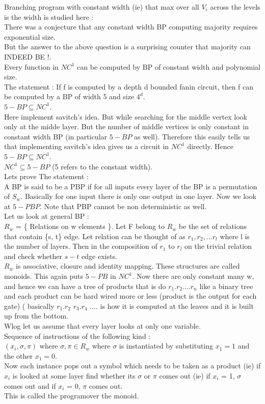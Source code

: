 \documentclass[solution,addpoints,12pt]{exam}
\begin{document}
Branching program with constant width (ie) that max over all $V_i$ across
the levels is the width is studied here :\\
There was a conjecture that any constant width BP computing majority requires exponential
size.\\
But the answer to the above question is a surprising counter that majority can INDEED BE !.\\
Every function in ${NC}^1$ can be computed by BP of constant width and polynomial size.\\
The statement : If f is computed by a depth d bounded fanin circuit, then f can be computed
by a BP of width 5 and size $4^d$.\\
$5-BP \subseteq {NC}^1$.\\
Here implement savitch's idea. But while searching for the middle vertex
look only at the midde layer. But the number of middle vertices is only
constant in constant width BP (in particular $5-BP$ as well). Therefore
this easily tells us that implementing savitch's idea gives us a circuit in
${NC}^1$ directly. Hence $5-BP \subseteq {NC}^1$.\\

${NC}^1 \subseteq 5-BP$ (5 refers to the constant width).\\

Lets prove The statement :\\
A BP is said to be a PBP if for all inputs every layer of the BP is
a permutation of $S_w$. Basically for one input there is only one output in one layer.
Now we look at $5-PBP$. Note that PBP cannot be non deterministic as well.\\
Let us look at general BP :\\
$R_w$ = \{ Relations on w elements \}. Let F belong to $R_w$
be the set of relations that contain \{s, t\} edge.
Let relation can be thought of as
$r_1, r_2, ... r_l$ where l is the number of layers. Then in the composition
of $r_1$ to $r_l$ on the trivial relation and
check whether $s-t$ edge exists.\\
$R_w$ is associative, closure and identity mapping. These structures
are called monoids. This again puts $5-PB$ in ${NC}^1$. Now there
are only constant many w, and hence we can have a tree of products
that is do $r_1.r_2....r_n$ like a binary tree and each product can
be hard wired more or less (product is the output for each gate) (
basically $r_1.r_2$ $r_3.r_4$ .... is how it is computed at the
leaves and it is built up from the bottom.\\

Wlog let us assume that every layer looks at only one variable.\\
Sequence of instructions of the following kind :\\
$(x_i, \sigma, \pi)$ where $\sigma, \pi \in R_w$
where $\sigma$ is instantiated by substituting $x_1 = 1$ and the other
$x_1 = 0$.\\
Now each instance pops out a symbol which needs to be taken as a product (ie)
if $x_i$ is looked at some layer find whether its $\sigma$ or $\pi$ comes
out (ie) if $x_i$ = 1, $\sigma$ comes out and if $x_i$ = 0, $\pi$ comes out.\\


This is called the programover the monoid.
\end{document}
